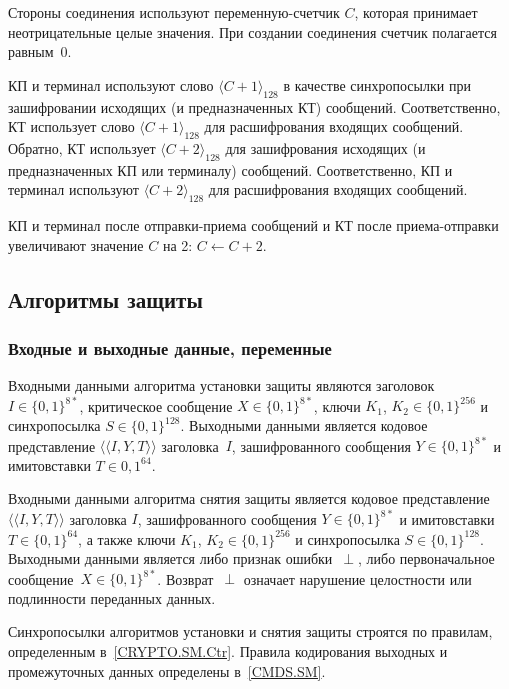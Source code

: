 Стороны соединения используют переменную-счетчик $C$, которая принимает 
неотрицательные целые значения. При создании соединения счетчик 
полагается равным~$0$.

КП и терминал используют слово $\langle C + 1 \rangle_{128}$ в качестве 
синхропосылки при зашифровании исходящих (и предназначенных КТ) сообщений. 
Соответственно, КТ использует слово $\langle C + 1 \rangle_{128}$ для 
расшифрования входящих сообщений. Обратно, КТ использует $\langle C + 2 
\rangle_{128}$ для зашифрования исходящих (и предназначенных КП или 
терминалу) сообщений. Соответственно, КП и терминал используют $\langle C + 2 
\rangle_{128}$ для расшифрования входящих сообщений. 

КП и терминал после отправки-приема сообщений и КТ после приема-отправки 
увеличивают значение $C$ на 2: $C\gets C + 2$.

\subsection{Алгоритмы защиты}\label{CRYPTO.SM.Algs}

\subsubsection{Входные и выходные данные, переменные}
\label{CRYPTO.SM.Algs.InOut}

Входными данными алгоритма установки защиты являются заголовок~$I\in\{0,1\}^{8*}$, 
критическое сообщение $X \in\{0,1\}^{8*}$, 
ключи $K_1$, $K_2\in\{0,1\}^{256}$ и 
синхропосылка $S\in\{0,1\}^{128}$.
Выходными данными является кодовое представление 
$\langle\langle I, Y, T \rangle\rangle$
заголовка~$I$, зашифрованного сообщения $Y \in\{0,1\}^{8*}$ 
и имитовставки $T \in {0,1}^{64}$.

Входными данными алгоритма снятия защиты является кодовое представление 
$\langle\langle I, Y, T\rangle\rangle$ заголовка $I$, зашифрованного 
сообщения $Y \in\{0,1\}^{8*}$ и имитовставки $T \in\{0, 1\}^{64}$, а также 
ключи $K_1$, $K_2 \in\{0,1\}^{256}$ и синхропосылка $S \in\{0,1\}^{128}$. 
Выходными данными является либо признак ошибки~$\perp$, либо первоначальное 
сообщение~$X\in\{0,1\}^{8*}$. Возврат~$\perp$ означает нарушение целостности 
или подлинности переданных данных.

Синхропосылки алгоритмов установки и снятия защиты строятся по правилам, 
определенным в~\ref{CRYPTO.SM.Ctr}. Правила кодирования выходных и 
промежуточных данных определены в~\ref{CMDS.SM}.

